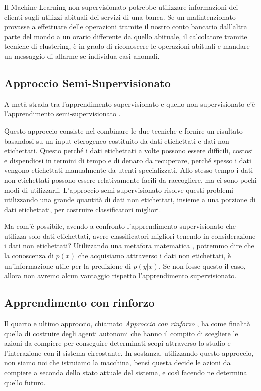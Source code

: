 \documentclass[a4paper,12pt]{report}
\begin{document}
Il Machine Learning non supervisionato potrebbe utilizzare informazioni dei clienti sugli utilizzi abituali dei servizi di una banca. Se un malintenzionato provasse a effettuare delle operazioni tramite il nostro conto bancario dall'altra parte del mondo a un orario differente da quello abituale, il calcolatore tramite tecniche di clustering, è in grado di riconoscere le operazioni abituali e mandare un messaggio di allarme se individua casi anomali.

\subsection*{Approccio Semi-Supervisionato}
A metà strada tra l'apprendimento supervisionato e quello non supervisionato c'è l'apprendimento semi-supervisionato \cite{supervisedlearning}.

Questo approccio consiste nel combinare le due tecniche e fornire un risultato basandosi su un input eterogeneo costituito da dati etichettati e dati non etichettati.
Questo perché i dati etichettati a volte possono essere difficili, costosi e dispendiosi in termini di tempo e di denaro da recuperare, perché spesso i dati vengono etichettati manualmente da utenti specializzati. Allo stesso tempo i dati non etichettati possono essere relativamente facili da raccogliere, ma ci sono pochi modi di utilizzarli. 
L'approccio semi-supervisionato risolve questi problemi utilizzando una grande quantità di dati non etichettati, insieme a una porzione di dati etichettati, per costruire classificatori migliori. 

Ma com'è possibile, avendo a confronto l'apprendimento supervisionato che utilizza solo dati etichettati, avere classificatori migliori tenendo in considerazione i dati non etichettati?
Utilizzando una metafora matematica \cite{supervisedlearning}, potremmo dire che la conoscenza di $p(x)$ che acquisiamo attraverso i dati non etichettati, è un'informazione utile per la predizione di $p(y|x)$. Se non fosse questo il caso, allora non avremo alcun vantaggio rispetto l'apprendimento supervisionato.

\subsection*{Apprendimento con rinforzo}
Il quarto e ultimo approccio, chiamato \textit{Approccio con rinforzo} \cite{Reinforcement_learning}, ha come finalità quella di costruire degli agenti autonomi che hanno il compito di scegliere le azioni da compiere per conseguire determinati scopi attraverso lo studio e l'interazione con il sistema circostante.
In sostanza, utilizzando questo approccio, non siamo noi che istruiamo la macchina, bensì questa decide le azioni da compiere a seconda dello stato attuale del sistema, e così facendo ne determina quello futuro.
\end{document}
